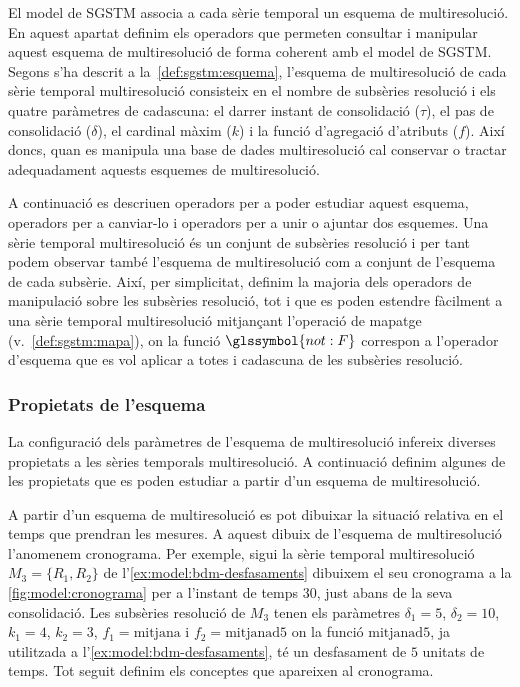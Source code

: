 El model de \gls{SGSTM} associa a cada sèrie temporal un esquema de
multiresolució. En aquest apartat definim els operadors que permeten
consultar i manipular aquest esquema de multiresolució de forma
coherent amb el model de \gls{SGSTM}.
Segons s'ha descrit a la~\autoref{def:sgstm:esquema}, l'esquema de
multiresolució de cada sèrie temporal multiresolució consisteix en el
nombre de subsèries resolució i els quatre paràmetres de cadascuna: el
darrer instant de consolidació ($\tau$), el pas de consolidació
($\delta$), el cardinal màxim ($k$) i la funció d'agregació d'atributs
($f$).  Així doncs, quan es manipula una base de dades multiresolució
cal conservar o tractar adequadament aquests esquemes de
multiresolució.


A continuació es descriuen operadors per a poder estudiar aquest
esquema, operadors per a canviar-lo i operadors per a unir o ajuntar
dos esquemes.  Una sèrie temporal multiresolució és un conjunt de
subsèries resolució i per tant podem observar també l'esquema de
multiresolució com a conjunt de l'esquema de cada subsèrie.  Així, per
simplicitat, definim la majoria dels operadors de manipulació sobre
les subsèries resolució, tot i que es poden estendre fàcilment a una sèrie
temporal multiresolució mitjançant l'operació de mapatge
(v.~\autoref{def:sgstm:mapa}), on la funció $\glssymbol{not:F}$
correspon a l'operador d'esquema que es vol aplicar a totes i
cadascuna de les subsèries resolució.




\subsubsection{Propietats de l'esquema}


La configuració dels paràmetres de l'esquema de multiresolució
infereix diverses propietats a les sèries temporals multiresolució. A
continuació definim algunes de les propietats que es poden estudiar a
partir d'un esquema de multiresolució.


A partir d'un esquema de multiresolució es pot dibuixar la situació
relativa en el temps que prendran les mesures. A aquest dibuix de
l'esquema de multiresolució l'anomenem cronograma. Per exemple, sigui
la sèrie temporal multiresolució $M_3=\{R_1,R_2\}$ de
l'\autoref{ex:model:bdm-desfasaments} dibuixem el seu cronograma a la
\autoref{fig:model:cronograma} per a l'instant de temps $30$, just
abans de la seva consolidació. Les subsèries resolució de $M_3$ tenen
els paràmetres $\delta_1=5$, $\delta_2=10$, $k_1=4$, $k_2=3$,
$f_1=\text{mitjana}$ i $f_2=\text{mitjanad5}$ on la funció
$\text{mitjanad5}$, ja utilitzada a
l'\autoref{ex:model:bdm-desfasaments}, té un desfasament de $5$
unitats de temps. Tot seguit definim els conceptes que apareixen al
cronograma.

